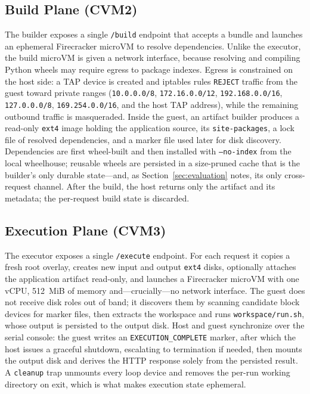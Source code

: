 \subsection{Build Plane (CVM2)}

The builder exposes a single \texttt{/build} endpoint that accepts a bundle and launches an
ephemeral Firecracker microVM to resolve dependencies. Unlike the executor, the build
microVM is given a network interface, because resolving and compiling Python wheels may
require egress to package indexes. Egress is constrained on the host side: a TAP device is
created and iptables rules \texttt{REJECT} traffic from the guest toward private ranges
(\texttt{10.0.0.0/8}, \texttt{172.16.0.0/12}, \texttt{192.168.0.0/16},
\texttt{127.0.0.0/8}, \texttt{169.254.0.0/16}, and the host TAP address), while the
remaining outbound traffic is masqueraded. Inside the guest, an artifact builder produces a
read-only \texttt{ext4} image holding the application source, its \texttt{site-packages}, a
lock file of resolved dependencies, and a marker file used later for disk discovery.
Dependencies are first wheel-built and then installed with \texttt{--no-index} from the
local wheelhouse; reusable wheels are persisted in a size-pruned cache that is the builder's
only durable state---and, as Section~\ref{sec:evaluation} notes, its only cross-request
channel. After the build, the host returns only the artifact and its metadata; the
per-request build state is discarded.

\subsection{Execution Plane (CVM3)}

The executor exposes a single \texttt{/execute} endpoint. For each request it copies a fresh
root overlay, creates new input and output \texttt{ext4} disks, optionally attaches the
application artifact read-only, and launches a Firecracker microVM with one vCPU, 512~MiB of
memory and---crucially---no network interface. The guest does not receive disk roles out of
band; it discovers them by scanning candidate block devices for marker files, then extracts
the workspace and runs \texttt{workspace/run.sh}, whose output is persisted to the output
disk. Host and guest synchronize over the serial console: the guest writes an
\texttt{EXECUTION\_COMPLETE} marker, after which the host issues a graceful shutdown,
escalating to termination if needed, then mounts the output disk and derives the HTTP
response solely from the persisted result. A \texttt{cleanup} trap unmounts every loop device
and removes the per-run working directory on exit, which is what makes execution state
ephemeral.

